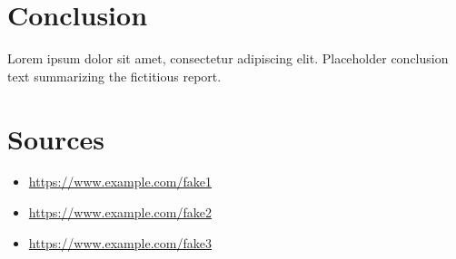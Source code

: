 \documentclass[12pt]{article}
\begin{document}
\section{Conclusion}
Lorem ipsum dolor sit amet, consectetur adipiscing elit. Placeholder conclusion text summarizing the fictitious report.

\section{Sources}
\begin{itemize}
    \item \url{https://www.example.com/fake1}
    \item \url{https://www.example.com/fake2}
    \item \url{https://www.example.com/fake3}
\end{itemize}
\end{document}
